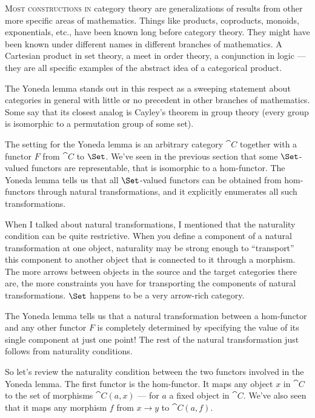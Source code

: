 
\lettrine[lhang=0.17]{M}{ost constructions in} category theory are generalizations of results
from other more specific areas of mathematics. Things like products,
coproducts, monoids, exponentials, etc., have been known long before
category theory. They might have been known under different names in
different branches of mathematics. A Cartesian product in set theory, a
meet in order theory, a conjunction in logic --- they are all specific
examples of the abstract idea of a categorical product.

The Yoneda lemma stands out in this respect as a sweeping statement
about categories in general with little or no precedent in other
branches of mathematics. Some say that its closest analog is Cayley's
theorem in group theory (every group is isomorphic to a permutation
group of some set).

The setting for the Yoneda lemma is an arbitrary category $\cat{C}$
together with a functor $F$ from $\cat{C}$ to $\Set$. We've
seen in the previous section that some $\Set$-valued functors are
representable, that is isomorphic to a hom-functor. The Yoneda lemma
tells us that all $\Set$-valued functors can be obtained from
hom-functors through natural transformations, and it explicitly
enumerates all such transformations.

When I talked about natural transformations, I mentioned that the
naturality condition can be quite restrictive. When you define a
component of a natural transformation at one object, naturality may be
strong enough to ``transport'' this component to another object that is
connected to it through a morphism. The more arrows between objects in
the source and the target categories there are, the more constraints you
have for transporting the components of natural transformations.
$\Set$ happens to be a very arrow-rich category.

The Yoneda lemma tells us that a natural transformation between a
hom-functor and any other functor $F$ is completely determined by
specifying the value of its single component at just one point! The rest
of the natural transformation just follows from naturality conditions.

So let's review the naturality condition between the two functors
involved in the Yoneda lemma. The first functor is the hom-functor. It
maps any object $x$ in $\cat{C}$ to the set of morphisms
$\cat{C}(a, x)$ --- for $a$ a fixed object in $\cat{C}$. We've
also seen that it maps any morphism $f$ from $x \to y$ to $\cat{C}(a, f)$.

